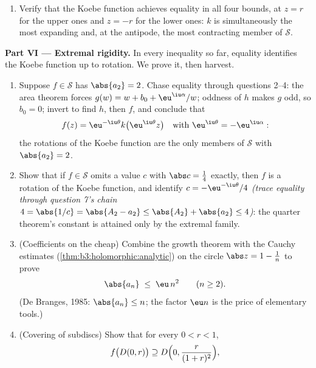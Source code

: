 \begin{problem}
\begin{enumerate}[resume]
{        question 7; pull it back by $f^{-1}$ ---
        holomorphic by
        \cref{cor:b3:residues:openmapping} --- and bound
        $\abs{f(z)} = \int_\gamma\abs{f'(\zeta)}
        \,\abs{\dd\zeta} \geq \int_0^r\frac{1 - t}{(1 +
        t)^3}\,\dd t$, using $\abs{\dd\zeta} \geq
        \dd\abs\zeta$)}.
  \item Verify that the Koebe function achieves equality in
        all four bounds, at $z = r$ for the upper ones and
        $z = -r$ for the lower ones: $k$ is simultaneously
        the most expanding and, at the antipode, the most
        contracting member of $\mathcal S$.
\end{enumerate}

\medskip
\noindent\textbf{Part VI --- Extremal rigidity.} In every
inequality so far, equality identifies the Koebe function up
to rotation. We prove it, then harvest.
\begin{enumerate}[resume]
  \item Suppose $f \in \mathcal S$ has $\abs{a_2} = 2$.
        Chase equality through questions 2--4: the area
        theorem forces $g(w) = w + b_0 + \eu^{\iu\alpha}/w$;
        oddness of $h$ makes $g$ odd, so $b_0 = 0$; invert
        to find $h$, then $f$, and conclude that
        \[
        f(z) = \eu^{-\iu\theta}k\bigl(\eu^{\iu\theta}z\bigr)
        \quad\text{with } \eu^{\iu\theta} =
        -\eu^{\iu\alpha} :
        \]
        the rotations of the Koebe function are the only
        members of $\mathcal S$ with $\abs{a_2} = 2$.
  \item Show that if $f \in \mathcal S$ omits a value $c$
        with $\abs c = \frac14$ exactly, then $f$ is a
        rotation of the Koebe function, and identify $c =
        -\eu^{-\iu\theta}/4$ \emph{(trace equality through
        question 7's chain $4 = \abs{1/c} = \abs{A_2 - a_2}
        \leq \abs{A_2} + \abs{a_2} \leq 4$)}: the quarter
        theorem's constant is attained only by the extremal
        family.
  \item (Coefficients on the cheap) Combine the growth
        theorem with the Cauchy estimates
        (\cref{thm:b3:holomorphic:analytic}) on the circle
        $\abs z = 1 - \frac1n$ to prove
        \[
        \abs{a_n} \;\leq\; \eu\,n^2 \qquad (n \geq 2) .
        \]
        (De Branges, 1985: $\abs{a_n} \leq n$; the factor
        $\eu n$ is the price of elementary tools.)
  \item (Covering of subdiscs) Show that for every $0 < r <
        1$,
        \[
        f\bigl(D(0, r)\bigr) \supseteq
        D\Bigl(0, \frac{r}{(1 + r)^2}\Bigr),
\]
\end{enumerate}
\end{problem}
